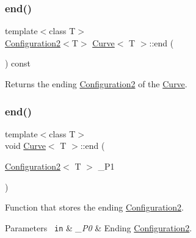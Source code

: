 \subsubsection{\texorpdfstring{end()}{end()}\hspace{0.1cm}{\footnotesize\ttfamily [1/2]}}
{\footnotesize\ttfamily template$<$class T$>$ \\
\mbox{\hyperlink{class_configuration2}{Configuration2}}$<$T$>$ \mbox{\hyperlink{class_curve}{Curve}}$<$ T $>$\+::end (\begin{DoxyParamCaption}{ }\end{DoxyParamCaption}) const\hspace{0.3cm}{\ttfamily [inline]}}



Returns the ending {\ttfamily \mbox{\hyperlink{class_configuration2}{Configuration2}}} of the {\ttfamily \mbox{\hyperlink{class_curve}{Curve}}}. 

\mbox{\label{class_curve_a5b11ffc442dcdca2def5d09ad4fbb424}} 
\subsubsection{\texorpdfstring{end()}{end()}\hspace{0.1cm}{\footnotesize\ttfamily [2/2]}}
{\footnotesize\ttfamily template$<$class T$>$ \\
void \mbox{\hyperlink{class_curve}{Curve}}$<$ T $>$\+::end (\begin{DoxyParamCaption}\item[{\mbox{\hyperlink{class_configuration2}{Configuration2}}$<$ T $>$}]{\+\_\+\+P1 }\end{DoxyParamCaption})\hspace{0.3cm}{\ttfamily [inline]}}

Function that stores the ending {\ttfamily \mbox{\hyperlink{class_configuration2}{Configuration2}}}. 
\begin{DoxyParams}[1]{Parameters}
\mbox{\texttt{ in}}  & {\em \+\_\+\+P0} & Ending {\ttfamily \mbox{\hyperlink{class_configuration2}{Configuration2}}}. \\
\hline
\end{DoxyParams}
\mbox{\label{class_curve_a92e5b3a7445040e0e1e8a96707c5e6c2}} 
